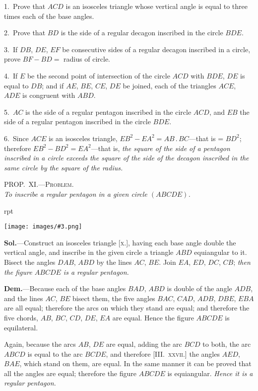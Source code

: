 \documentclass[oneside]{book}
\newcounter{wrapwidth}
\newcommand\myprop[2]{
\bigskip\Needspace*{4\baselineskip}\begin{center}\textsc{#1}\\\medskip\emph{#2}\par\end{center}
}
\newcommand\imgflow[3]{
\setcounter{wrapwidth}{#1}
\begin{wrapfigure}[#2]{r}{\value{wrapwidth}pt}
\begin{center}
\vspace{-0.3in}
\texttt{[image: images/\#3.png]}
\end{center}
\end{wrapfigure}
}
\begin{document}
\begin{footnotesize}
1.~Prove that $ACD$ is an isosceles triangle whose vertical angle
is equal to three times each of the base angles.

2.~Prove that $BD$ is the side of a regular decagon inscribed in
the circle $BDE$.

3.~If $DB$, $DE$, $EF$ be consecutive sides of a regular decagon
inscribed in a circle, prove $BF - BD =$ radius of circle.

4.~If $E$ be the second point of intersection of the circle $ACD$
with $BDE$, $DE$ is equal to $DB$; and if $AE$, $BE$, $CE$, $DE$ be
joined, each of the triangles $ACE$, $ADE$ is congruent with $ABD$.

5.~$AC$ is the side of a regular pentagon inscribed in the circle
$ACD$, and $EB$ the side of a regular pentagon inscribed in the
circle $BDE$.

6.~Since $ACE$ is an isosceles triangle, $EB^{2} - EA^{2} = AB\,.\,BC$---that
is = $BD^{2}$; therefore $EB^{2} - BD^{2} = EA^{2}$---that is, \textit{the square
of the side of a pentagon inscribed in a circle exceeds the square of
the side of the decagon inscribed in the same circle by the square of
the radius.}
\par\end{footnotesize}

\myprop{PROP\@.~XI\@.---Problem.}{To inscribe a regular pentagon in a given circle $(ABCDE)$.}

\imgflow{130}{11}{f163}

\textbf{Sol.}---Construct an isosceles triangle [\textsc{x.}], having
each base angle double the vertical
angle, and inscribe in the
given circle a triangle $ABD$
equiangular to it. Bisect the
angles $DAB$, $ABD$ by the lines
$AC$, $BE$. Join $EA$, $ED$, $DC$,
$CB$; \emph{then the figure $ABCDE$ is
a regular pentagon.}

\textbf{Dem.}---Because each of the
base angles $BAD$, $ABD$ is
double of the angle $ADB$, and the lines $AC$, $BE$ bisect
them, the five angles $BAC$, $CAD$, $ADB$, $DBE$, $EBA$ are
all equal; therefore the arcs on which they stand are
equal; and therefore the five chords, $AB$, $BC$, $CD$, $DE$,
$EA$ are equal. Hence the figure $ABCDE$ is equilateral.

Again, because the arcs $AB$, $DE$ are equal, adding
the arc $BCD$ to both, the arc $ABCD$ is equal to the arc
$BCDE$, and therefore [III\@.~\textsc{xxvii.}] the angles $AED$,
$BAE$, which stand on them, are equal. In the same
manner it can be proved that all the angles are equal;
therefore the figure $ABCDE$ is equiangular. \emph{Hence it
is a regular pentagon.}
\end{document}
